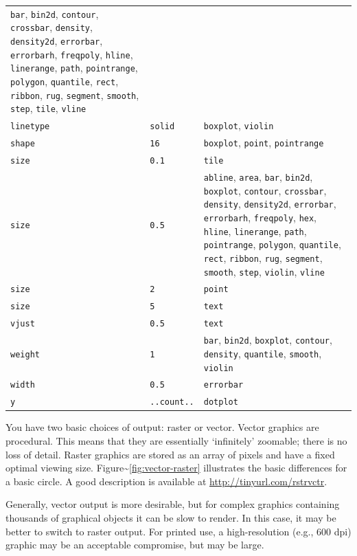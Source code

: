 \begin{longtable}[c]{@{}lll@{}}
\texttt{bar}, \texttt{bin2d}, \texttt{contour}, \texttt{crossbar},
\texttt{density}, \texttt{density2d}, \texttt{errorbar},
\texttt{errorbarh}, \texttt{freqpoly}, \texttt{hline},
\texttt{linerange}, \texttt{path}, \texttt{pointrange},
\texttt{polygon}, \texttt{quantile}, \texttt{rect}, \texttt{ribbon},
\texttt{rug}, \texttt{segment}, \texttt{smooth}, \texttt{step},
\texttt{tile}, \texttt{vline}\tabularnewline
\texttt{linetype} & \texttt{solid} & \texttt{boxplot},
\texttt{violin}\tabularnewline
\texttt{shape} & \texttt{16} & \texttt{boxplot}, \texttt{point},
\texttt{pointrange}\tabularnewline
\texttt{size} & \texttt{0.1} & \texttt{tile}\tabularnewline
\texttt{size} & \texttt{0.5} & \texttt{abline}, \texttt{area},
\texttt{bar}, \texttt{bin2d}, \texttt{boxplot}, \texttt{contour},
\texttt{crossbar}, \texttt{density}, \texttt{density2d},
\texttt{errorbar}, \texttt{errorbarh}, \texttt{freqpoly}, \texttt{hex},
\texttt{hline}, \texttt{linerange}, \texttt{path}, \texttt{pointrange},
\texttt{polygon}, \texttt{quantile}, \texttt{rect}, \texttt{ribbon},
\texttt{rug}, \texttt{segment}, \texttt{smooth}, \texttt{step},
\texttt{violin}, \texttt{vline}\tabularnewline
\texttt{size} & \texttt{2} & \texttt{point}\tabularnewline
\texttt{size} & \texttt{5} & \texttt{text}\tabularnewline
\texttt{vjust} & \texttt{0.5} & \texttt{text}\tabularnewline
\texttt{weight} & \texttt{1} & \texttt{bar}, \texttt{bin2d},
\texttt{boxplot}, \texttt{contour}, \texttt{density}, \texttt{quantile},
\texttt{smooth}, \texttt{violin}\tabularnewline
\texttt{width} & \texttt{0.5} & \texttt{errorbar}\tabularnewline
\texttt{y} & \texttt{..count..} & \texttt{dotplot}\tabularnewline
\bottomrule
\end{longtable}


You have two basic choices of output: raster or vector. Vector graphics
are procedural. This means that they are essentially `infinitely'
zoomable; there is no loss of detail. Raster graphics are stored as an
array of pixels and have a fixed optimal viewing size.
Figure\textasciitilde{}\ref{fig:vector-raster} illustrates the basic
differences for a basic circle. A good description is available at
\url{http://tinyurl.com/rstrvctr}.  

Generally, vector output is more desirable, but for complex graphics
containing thousands of graphical objects it can be slow to render. In
this case, it may be better to switch to raster output. For printed use,
a high-resolution (e.g., 600 dpi) graphic may be an acceptable
compromise, but may be large.

